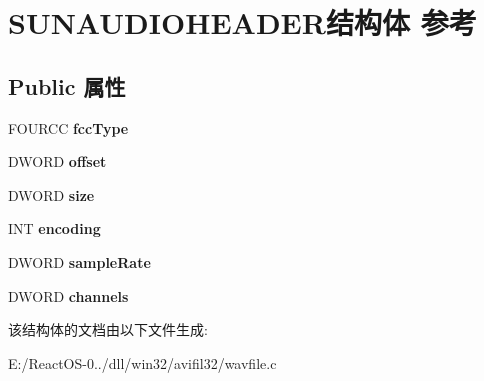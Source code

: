\hypertarget{struct_s_u_n_a_u_d_i_o_h_e_a_d_e_r}{}\section{S\+U\+N\+A\+U\+D\+I\+O\+H\+E\+A\+D\+E\+R结构体 参考}
\label{struct_s_u_n_a_u_d_i_o_h_e_a_d_e_r}
\subsection*{Public 属性}
\begin{DoxyCompactItemize}
\item 
\mbox{\label{struct_s_u_n_a_u_d_i_o_h_e_a_d_e_r_a0231ba726d6c7d618fc44e7158884789}} 
F\+O\+U\+R\+CC {\bfseries fcc\+Type}
\item 
\mbox{\label{struct_s_u_n_a_u_d_i_o_h_e_a_d_e_r_a5f33a2a72db966f54abed8bd91ed61d2}} 
D\+W\+O\+RD {\bfseries offset}
\item 
\mbox{\label{struct_s_u_n_a_u_d_i_o_h_e_a_d_e_r_a92d6bcb7ba14631731aa441a8ad4fbea}} 
D\+W\+O\+RD {\bfseries size}
\item 
\mbox{\label{struct_s_u_n_a_u_d_i_o_h_e_a_d_e_r_aa445b2752365135c3df5192cfb26e32b}} 
I\+NT {\bfseries encoding}
\item 
\mbox{\label{struct_s_u_n_a_u_d_i_o_h_e_a_d_e_r_a4a2356a315659f1051138352126bd9ca}} 
D\+W\+O\+RD {\bfseries sample\+Rate}
\item 
\mbox{\label{struct_s_u_n_a_u_d_i_o_h_e_a_d_e_r_ac1f5be09b7fb20fab265a2422a38c77f}} 
D\+W\+O\+RD {\bfseries channels}
\end{DoxyCompactItemize}


该结构体的文档由以下文件生成\+:\begin{DoxyCompactItemize}
\item 
E\+:/\+React\+O\+S-\/0../dll/win32/avifil32/wavfile.\+c\end{DoxyCompactItemize}

